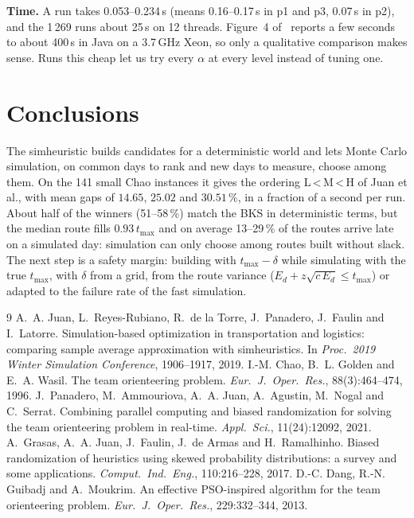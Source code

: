 \documentclass[10pt,a4paper]{article}
\begin{document}
\textbf{Time.} A run takes 0.053--0.234\,s (means 0.16--0.17\,s in p1 and p3, 0.07\,s in p2), and the 1\,269
runs about 25\,s on 12 threads. Figure~4 of~\cite{juan2019} reports a few seconds to about 400\,s in Java
on a 3.7\,GHz Xeon, so only a qualitative comparison makes sense. Runs this cheap let
us try every $\alpha$ at every level instead of tuning one.

\section{Conclusions}

The simheuristic builds candidates for a deterministic world and lets Monte Carlo simulation, on
common days to rank and new days to measure, choose among them. On the 141 small Chao instances it
gives the ordering L\,<\,M\,<\,H of Juan et al., with mean gaps of $14.65$, $25.02$ and $30.51\,\%$, in a
fraction of a second per run. About half of the winners (51--58\,\%) match the BKS in deterministic terms, but the median
route fills $0.93\,t_{\max}$ and on average 13--29\,\% of the routes arrive late on a simulated day:
simulation can only choose among routes built without slack. The next step is a safety margin: building with $t_{\max}-\delta$ while simulating
with the true $t_{\max}$, with $\delta$ from a grid, from the route variance
($E_d+z\sqrt{c\,E_d}\le t_{\max}$) or adapted to the failure rate of the fast simulation.

\begin{thebibliography}{9}
\footnotesize\setlength{\itemsep}{0pt}\setlength{\parskip}{0pt}
 A.~A. Juan, L.~Reyes-Rubiano, R.~de la Torre, J.~Panadero, J.~Faulin and I.~Latorre.
Simulation-based optimization in transportation and logistics: comparing sample average approximation
with simheuristics. In \emph{Proc.\ 2019 Winter Simulation Conference}, 1906--1917, 2019.
 I.-M. Chao, B.~L. Golden and E.~A. Wasil. The team orienteering problem.
\emph{Eur.\ J.\ Oper.\ Res.}, 88(3):464--474, 1996.
 J.~Panadero, M.~Ammouriova, A.~A. Juan, A.~Agustin, M.~Nogal and C.~Serrat.
Combining parallel computing and biased randomization for solving the team orienteering problem in
real-time. \emph{Appl.\ Sci.}, 11(24):12092, 2021.
 A.~Grasas, A.~A. Juan, J.~Faulin, J.~de Armas and H.~Ramalhinho. Biased
randomization of heuristics using skewed probability distributions: a survey and some applications.
\emph{Comput.\ Ind.\ Eng.}, 110:216--228, 2017.
 D.-C. Dang, R.-N. Guibadj and A.~Moukrim. An effective PSO-inspired algorithm for the
team orienteering problem. \emph{Eur.\ J.\ Oper.\ Res.}, 229:332--344, 2013.
\end{thebibliography}
\end{document}
